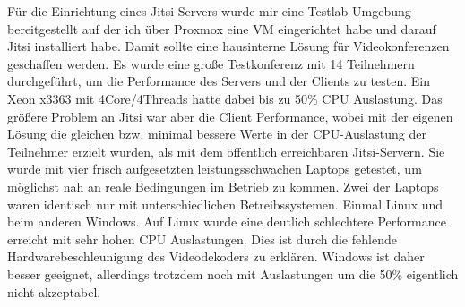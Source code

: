 \documentclass[english,runningheads,a4paper]{llncs}[2018/03/10]
\begin{document}
Für die Einrichtung eines Jitsi Servers wurde mir eine Testlab Umgebung bereitgestellt auf der ich über Proxmox eine VM eingerichtet habe und darauf Jitsi installiert habe. Damit sollte eine hausinterne Lösung für Videokonferenzen geschaffen werden. Es wurde eine große Testkonferenz mit 14 Teilnehmern durchgeführt, um die Performance des Servers und der Clients zu testen. Ein Xeon x3363 mit 4Core/4Threads hatte dabei bis zu 50\% CPU Auslastung. Das größere Problem an Jitsi war aber die Client Performance, wobei mit der eigenen Lösung die  gleichen bzw. minimal  bessere Werte in der CPU-Auslastung der Teilnehmer erzielt wurden, als mit dem öffentlich erreichbaren Jitsi-Servern. Sie wurde mit vier frisch aufgesetzten leistungsschwachen Laptops getestet, um möglichst nah an reale Bedingungen im Betrieb zu kommen. Zwei der Laptops waren identisch nur mit unterschiedlichen Betreibssystemen. Einmal Linux und beim anderen Windows. Auf Linux wurde eine deutlich schlechtere Performance erreicht mit sehr hohen CPU Auslastungen. Dies ist durch die fehlende Hardwarebeschleunigung des Videodekoders zu erklären. Windows ist daher besser geeignet, allerdings trotzdem noch mit Auslastungen um die 50\% eigentlich nicht akzeptabel.
\end{document}
